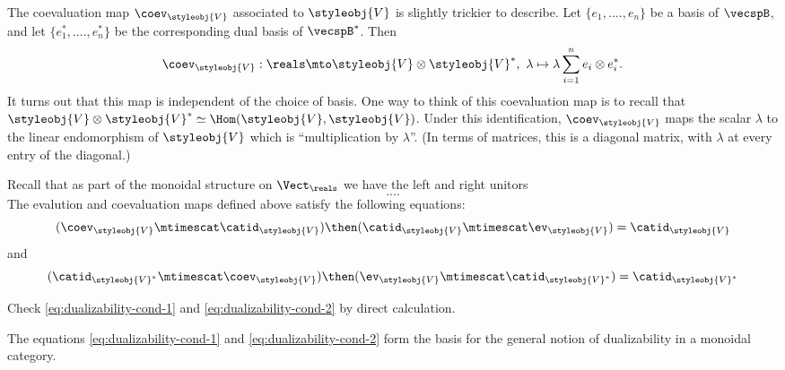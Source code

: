 The coevaluation map $\coev_\styleobj{V} $ associated to $\styleobj{V} $ is slightly trickier to describe. Let $\{e_1, ...., e_n \}$ be a basis of $\vecspB$, and let $\{e_1^*, ...., e_n^* \}$ be the corresponding dual basis of $\vecspB^*$. Then
\begin{equation}\label{eq:coevaluation-vecsp}
\coev_\styleobj{V}  : \reals \mto \styleobj{V}  \otimes \styleobj{V}^*, \ \lambda \mapsto \lambda \sum_{i=1}^n e_i \otimes e_i^*.
\end{equation}
It turns out that this map is independent of the choice of basis. One way to think of this coevaluation map is to recall that $\styleobj{V}  \otimes \styleobj{V}^* \simeq \Hom(\styleobj{V}, \styleobj{V})$. Under this identification, $\coev_\styleobj{V}$ maps the scalar $\lambda$ to the linear endomorphism of $\styleobj{V}$ which is ``multiplication by $\lambda$''. (In terms of matrices, this is a diagonal matrix, with $\lambda$ at every entry of the diagonal.)
 
Recall that as part of the monoidal structure on $\Vect_\reals$ we have the left and right unitors
\begin{equation}
....
\end{equation}
The evalution and coevaluation maps defined above satisfy the following equations:
\begin{equation}\label{eq:dualizability-cond-1}
(\coev_\styleobj{V} \mtimescat \catid_\styleobj{V}) \then (\catid_\styleobj{V} \mtimescat \ev_\styleobj{V}) = \catid_{\styleobj{V}}
\end{equation}
and
\begin{equation}\label{eq:dualizability-cond-2}
 (\catid_{\styleobj{V}^*} \mtimescat \coev_\styleobj{V})  \then (\ev_\styleobj{V} \mtimescat \catid_{\styleobj{V}^*})  = \catid_{\styleobj{V}^*}
\end{equation}

\begin{gradedexercise}
Check \cref{eq:dualizability-cond-1} and \cref{eq:dualizability-cond-2} by direct calculation. 
\end{gradedexercise}

The equations \cref{eq:dualizability-cond-1} and \cref{eq:dualizability-cond-2} form the basis for the general notion of dualizability in a monoidal category. 

